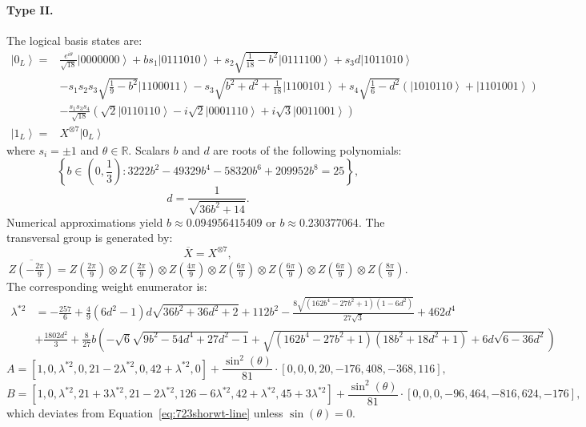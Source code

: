 \documentclass[8pt]{article}
\theoremstyle{definition}
\begin{document}
\paragraph{Type II.} The logical basis states are:
\begin{align*}
    \left|0_{L}\right\rangle = & \frac{e^{i\theta}}{\sqrt{18}}\left|0000000\right\rangle +bs_{1}\left|0111010\right\rangle +s_{2}\sqrt{\frac{1}{18}-b^{2}}\left|0111100\right\rangle +s_{3}d\left|1011010\right\rangle                                                 \\
                               & -s_{1}s_{2}s_{3}\sqrt{\frac{1}{9}-b^{2}}\left|1100011\right\rangle -s_{3}\sqrt{b^{2}+d^{2}+\frac{1}{18}}\left|1100101\right\rangle +s_{4}\sqrt{\frac{1}{6}-d^{2}}\left(\left|1010110\right\rangle +\left|1101001\right\rangle \right) \\
                               & -\frac{s_{1}s_{3}s_{4}}{\sqrt{18}}\left(\sqrt{2}\left|0110110\right\rangle -i\sqrt{2}\left|0001110\right\rangle +i\sqrt{3}\left|0011001\right\rangle \right)                                                                          \\
    \left|1_{L}\right\rangle = & X^{\otimes7}\left|0_{L}\right\rangle
\end{align*}
where \(s_i = \pm 1\) and \(\theta \in \mathbb{R}\). Scalars \(b\) and \(d\) are roots of the following polynomials:
\[ \left\{ b\in\left(0,\frac{1}{3}\right):3222b^{2}-49329b^{4}-58320b^{6}+209952b^{8}=25\right\}, \]
\[ d=\frac{1}{\sqrt{36b^{2}+14}}. \]
Numerical approximations yield \(b \approx 0.094956415409\) or \(b \approx 0.230377064\). The transversal group is generated by:
\[ \overline{X}=X^{\otimes7}, \]
\[ \overline{Z\left(-\tfrac{2\pi}{9}\right)}=Z\left(\tfrac{2\pi}{9}\right)\otimes Z\left(\tfrac{2\pi}{9}\right)\otimes Z\left(\tfrac{4\pi}{9}\right)\otimes Z\left(\tfrac{6\pi}{9}\right)\otimes Z\left(\tfrac{6\pi}{9}\right)\otimes Z\left(\tfrac{6\pi}{9}\right)\otimes Z\left(\tfrac{8\pi}{9}\right). \]
The corresponding weight enumerator is:
\begin{align*}
    \lambda^{*2} & =-\frac{257}{6}+\frac{4}{9}\left(6d^{2}-1\right)d\sqrt{36b^{2}+36d^{2}+2}+112b^{2}-\frac{8\sqrt{\left(162b^{4}-27b^{2}+1\right)\left(1-6d^{2}\right)}}{27\sqrt{3}}+462d^{4}     \\
                 & +\frac{1802d^{2}}{3}+\frac{8}{27}b\left(-\sqrt{6}\sqrt{9b^{2}-54d^{4}+27d^{2}-1}+\sqrt{\left(162b^{4}-27b^{2}+1\right)\left(18b^{2}+18d^{2}+1\right)}+6d\sqrt{6-36d^{2}}\right)
\end{align*}
\[ A=\left[1,0,\lambda^{*2},0,21-2\lambda^{*2},0,42+\lambda^{*2},0\right]+\frac{\sin^{2}(\theta)}{81}\cdot\left[0,0,0,20,-176,408,-368,116\right], \]
\[ B=\left[1,0,\lambda^{*2},21+3\lambda^{*2},21-2\lambda^{*2},126-6\lambda^{*2},42+\lambda^{*2},45+3\lambda^{*2}\right]+\frac{\sin^{2}(\theta)}{81}\cdot\left[0,0,0,-96,464,-816,624,-176\right], \]
which deviates from Equation~\eqref{eq:723shorwt-line} unless \(\sin(\theta) = 0\).
\end{document}
